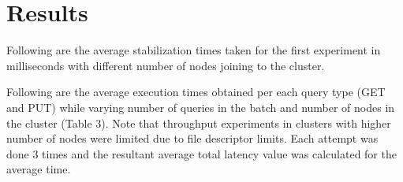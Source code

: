 \documentclass[
    a4paper,
    twocolumn,
]{article}
\begin{document}
\section{Results}

Following are the average stabilization times taken for the first experiment in milliseconds with different number of nodes joining to the cluster. 

Following are the average execution times obtained per each query type (GET and PUT) while varying number of queries in the batch and number of nodes in the cluster (Table 3). Note that throughput experiments in clusters with higher number of nodes were limited due to file descriptor limits. Each attempt was done 3 times and the resultant average total latency value was calculated for the average time.

\begin{table}[!ht]
	\renewcommand{\arraystretch}{1.5}
	\centering
	\caption{Results of experiments}
\end{table}
\end{document}
